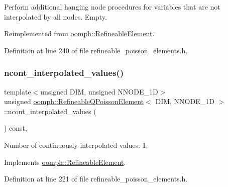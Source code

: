Perform additional hanging node procedures for variables that are not interpolated by all nodes. Empty. 



Reimplemented from \hyperlink{classoomph_1_1RefineableElement_a86ea01c485f7ff822dce74b884312ccb}{oomph\+::\+Refineable\+Element}.



Definition at line 240 of file refineable\+\_\+poisson\+\_\+elements.\+h.

\mbox{\label{classoomph_1_1RefineableQPoissonElement_a71e7df11399a174eab51b156da4948b9}} 
\subsubsection{\texorpdfstring{ncont\+\_\+interpolated\+\_\+values()}{ncont\_interpolated\_values()}}
{\footnotesize\ttfamily template$<$unsigned D\+IM, unsigned N\+N\+O\+D\+E\+\_\+1D$>$ \\
unsigned \hyperlink{classoomph_1_1RefineableQPoissonElement}{oomph\+::\+Refineable\+Q\+Poisson\+Element}$<$ D\+IM, N\+N\+O\+D\+E\+\_\+1D $>$\+::ncont\+\_\+interpolated\+\_\+values (\begin{DoxyParamCaption}{ }\end{DoxyParamCaption}) const\hspace{0.3cm}{\ttfamily [inline]}, {\ttfamily [virtual]}}



Number of continuously interpolated values\+: 1. 



Implements \hyperlink{classoomph_1_1RefineableElement_a53e171a18c9f43f1db90a6876516a073}{oomph\+::\+Refineable\+Element}.



Definition at line 221 of file refineable\+\_\+poisson\+\_\+elements.\+h.

\mbox{\label{classoomph_1_1RefineableQPoissonElement_a0f8a91fd025517b21f69c0e544daec7a}} 
